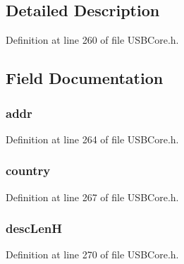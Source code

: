 \subsection{Detailed Description}


Definition at line 260 of file U\+S\+B\+Core.\+h.



\subsection{Field Documentation}
\hypertarget{struct_h_i_d_desc_descriptor_a7394c0f7cac587defeae4e84d34fb535}{}
\subsubsection[{addr}]{ addr}\label{struct_h_i_d_desc_descriptor_a7394c0f7cac587defeae4e84d34fb535}


Definition at line 264 of file U\+S\+B\+Core.\+h.

\hypertarget{struct_h_i_d_desc_descriptor_adf7dd313d5179831aef0bd2c06e7fb37}{}
\subsubsection[{country}]{ country}\label{struct_h_i_d_desc_descriptor_adf7dd313d5179831aef0bd2c06e7fb37}


Definition at line 267 of file U\+S\+B\+Core.\+h.

\hypertarget{struct_h_i_d_desc_descriptor_acb9cb52171317c0ea8140dd491c0d00e}{}
\subsubsection[{desc\+Len\+H}]{ desc\+Len\+H}\label{struct_h_i_d_desc_descriptor_acb9cb52171317c0ea8140dd491c0d00e}


Definition at line 270 of file U\+S\+B\+Core.\+h.

